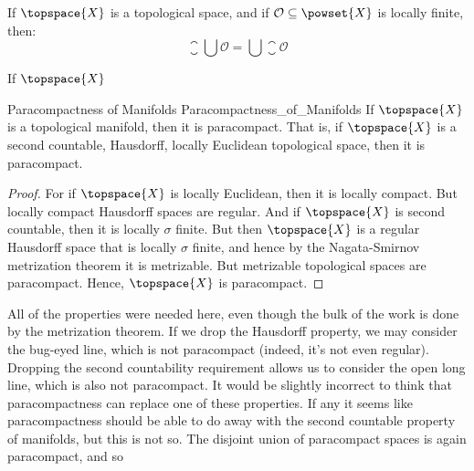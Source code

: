 \documentclass{article}                                                        %
\begin{document}
            \begin{theorem}
                If $\topspace{X}$ is a topological space, and if
                $\mathcal{O}\subseteq\powset{X}$ is locally finite, then:
                \begin{equation}
                    \closure{\bigcup\mathcal{O}}=
                    \bigcup\closure{\mathcal{O}}
                \end{equation}
            \end{theorem}
            \begin{theorem}
                If $\topspace{X}$
            \end{theorem}
            \begin{ftheorem}{Paracompactness of Manifolds}
                            {Paracompactness_of_Manifolds}
                If $\topspace{X}$ is a topological manifold, then it is
                paracompact. That is, if $\topspace{X}$ is a second countable,
                Hausdorff, locally Euclidean topological space, then it is
                paracompact.
            \end{ftheorem}
            \begin{proof}
                For if $\topspace{X}$ is locally Euclidean, then it is locally
                compact. But locally compact Hausdorff spaces are regular. And
                if $\topspace{X}$ is second countable, then it is locally
                $\sigma$ finite. But then $\topspace{X}$ is a regular Hausdorff
                space that is locally $\sigma$ finite, and hence by the
                Nagata-Smirnov metrization theorem it is metrizable. But
                metrizable topological spaces are paracompact. Hence,
                $\topspace{X}$ is paracompact.
            \end{proof}
            All of the properties were needed here, even though the bulk of the
            work is done by the metrization theorem. If we drop the Hausdorff
            property, we may consider the bug-eyed line, which is not
            paracompact (indeed, it's not even regular). Dropping the second
            countability requirement allows us to consider the open long line,
            which is also not paracompact. It would be slightly incorrect to
            think that paracompactness can replace one of these properties. If
            any it seems like paracompactness should be able to do away with
            the second countable property of manifolds, but this is not so. The
            disjoint union of paracompact spaces is again paracompact, and so
\end{document}
